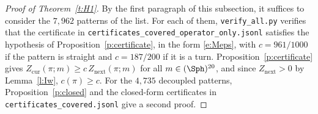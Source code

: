 \begin{proof}[Proof of Theorem~\ref{t:H1}]
By the first paragraph of this subsection, it suffices to consider the $7{,}962$ patterns of the list. For each of them, \texttt{verify\_all.py} verifies that the certificate in \texttt{certificates\_\allowbreak covered\_\allowbreak operator\_\allowbreak only.jsonl} satisfies the hypothesis of Proposition~\ref{p:certificate}, in the form \eqref{e:Meps}, with $c = 961/1000$ if the pattern is straight and $c = 187/200$ if it is a turn. Proposition~\ref{p:certificate} gives $Z_{\mathrm{cur}}(\pi; m) \ge c \, Z_{\mathrm{next}}(\pi; m)$ for all $m \in (\Sph)^{20}$, and since $Z_{\mathrm{next}} > 0$ by Lemma~\ref{l:Iw}, $c(\pi) \ge c$. For the $4{,}735$ decoupled patterns, Proposition~\ref{p:closed} and the closed-form certificates in \texttt{certificates\_\allowbreak covered.jsonl} give a second proof.
\end{proof}
